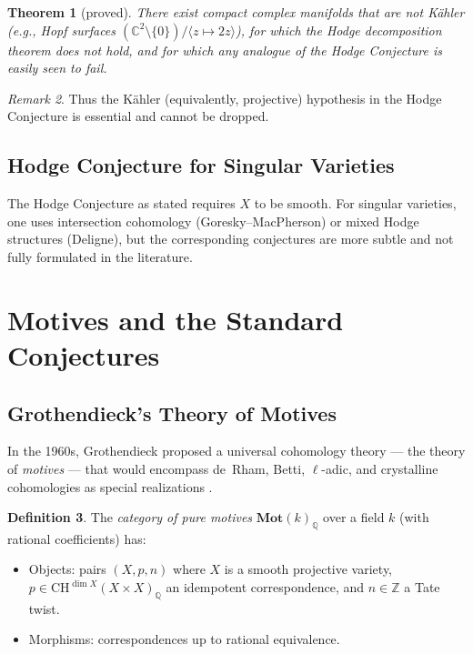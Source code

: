 \documentclass[12pt,a4paper]{amsart}
\newtheorem{theorem}{Theorem}[section]
\theoremstyle{definition}
\newtheorem{definition}[theorem]{Definition}
\theoremstyle{remark}
\newtheorem{remark}[theorem]{Remark}
\begin{document}
\begin{theorem}[proved]
There exist compact complex manifolds that are not Kähler (e.g., Hopf surfaces
$(\mathbb{C}^2 \setminus \{0\})/\langle z \mapsto 2z \rangle$), for which
the Hodge decomposition theorem does not hold, and for which any analogue of
the Hodge Conjecture is easily seen to fail.
\end{theorem}

\begin{remark}
Thus the Kähler (equivalently, projective) hypothesis in the Hodge Conjecture
is essential and cannot be dropped.
\end{remark}

\subsection{Hodge Conjecture for Singular Varieties}

The Hodge Conjecture as stated requires $X$ to be smooth. For singular varieties,
one uses intersection cohomology (Goresky–MacPherson) or mixed Hodge structures
(Deligne), but the corresponding conjectures are more subtle and not fully formulated
in the literature.

\section{Motives and the Standard Conjectures}
\label{sec:motives}

\subsection{Grothendieck's Theory of Motives}

In the 1960s, Grothendieck proposed a universal cohomology theory — the theory of
\emph{motives} — that would encompass de~Rham, Betti, $\ell$-adic, and crystalline
cohomologies as special realizations \cite{grothendieck1969}.

\begin{definition}
The \emph{category of pure motives} $\mathbf{Mot}(k)_\mathbb{Q}$ over a field $k$
(with rational coefficients) has:
\begin{itemize}
\item Objects: pairs $(X, p, n)$ where $X$ is a smooth projective variety,
  $p \in \mathrm{CH}^{\dim X}(X \times X)_\mathbb{Q}$ an idempotent correspondence,
  and $n \in \mathbb{Z}$ a Tate twist.
\item Morphisms: correspondences up to rational equivalence.
\end{itemize}
\end{definition}
\end{document}

